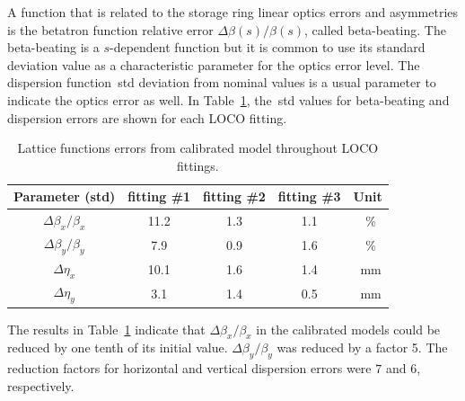 A function that is related to the storage ring linear optics errors and asymmetries is the betatron function relative error $\Delta \beta(s)/\beta(s)$, called beta-beating. The beta-beating is a $s$-dependent function but it is common to use its standard deviation value as a characteristic parameter for the optics error level. The dispersion function~\gls{std} deviation from nominal values is a usual parameter to indicate the optics error as well. In Table~\ref{tab:calibrated_optics}, the~\gls{std} values for beta-beating and dispersion errors are shown for each LOCO fitting.
\begin{table}[h!]
    \centering
    \caption{Lattice functions errors from calibrated model throughout LOCO fittings.}
    \label{tab:calibrated_optics}
    \begin{tabular}{ccccc}
        \toprule\toprule
        Parameter (std) & fitting \#1 & fitting \#2 & fitting \#3 & Unit \\
        \hline
        $\Delta\beta_x/\beta_x$ & \num{11.2} & \num{1.3} & \num{1.1} &\SI{}{\%}  \\
        $\Delta\beta_y/\beta_y$ & \num{7.9} & \num{0.9} & \num{1.6} &\SI{}{\%} \\
        $\Delta\eta_x$ &  \num{10.1} &  \num{1.6} & \num{1.4} & \SI{}{\milli\meter}  \\
        $\Delta\eta_y$ &  \num{3.1} &  \num{1.4} & \num{0.5} & \SI{}{\milli\meter} \\
        \bottomrule\bottomrule
    \end{tabular}
\end{table}

The results in Table~\ref{tab:calibrated_optics} indicate that $\Delta\beta_x/\beta_x$ in the calibrated models could be reduced by one tenth of its initial value. $\Delta\beta_y/\beta_y$ was reduced by a factor 5. The reduction factors for horizontal and vertical dispersion errors were $7$ and $6$, respectively.

